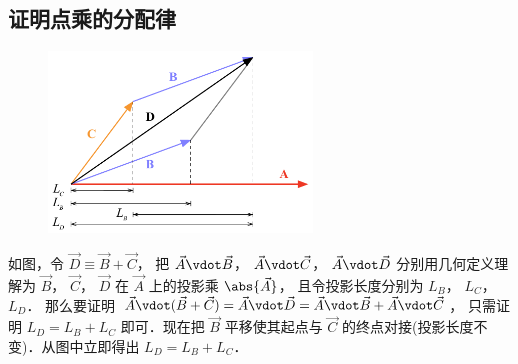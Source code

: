\subsection{证明点乘的分配律}
\begin{figure}[h]
\centering
\includegraphics[width=7cm]{./figures/Dot2.pdf}
\end{figure}
如图，令 $\vec D \equiv \vec B + \vec C$， 把 $\vec A \vdot \vec B$，  $\vec A \vdot \vec C$，  $\vec A \vdot \vec D$ 分别用几何定义理解为 $\vec B$，  $\vec C$，  $\vec D$ 在 $\vec A$ 上的投影乘 $\abs{\vec A}$， 且令投影长度分别为 $L_B$，  $L_C$，  $L_D$． 那么要证明 $\vec A \vdot (\vec B + \vec C) = \vec A \vdot \vec D = \vec A \vdot \vec B + \vec A \vdot \vec C$， 只需证明 $L_D = L_B + L_C$ 即可．现在把 $\vec B$ 平移使其起点与 $\vec C$ 的终点对接(投影长度不变)．从图中立即得出 $L_D = L_B + L_C$．  








